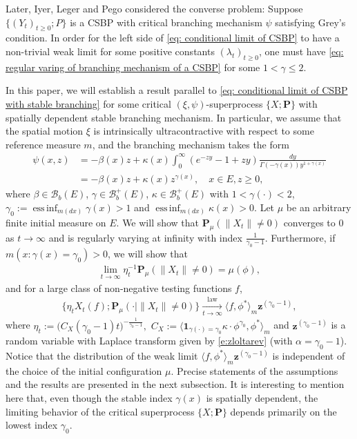 \documentclass[12pt,a4paper]{amsart}
\theoremstyle{definition}
\numberwithin{equation}{section}
\begin{document}
Later, Iyer, Leger and Pego \cite{IyerLegerPego2015Limit} considered the converse problem:
Suppose  $\{(Y_t)_{t\geq 0}; P\}$ is a CSBP
with critical branching mechanism $\psi$ satisfying Grey's condition.
In order for the left side of \eqref{eq: conditional limit of CSBP} to have a non-trivial weak limit for some positive constants $(\lambda_t)_{t\geq 0}$, one must have \eqref{eq: regular varing of branching mechanism of a CSBP} for some $1< \gamma \leq 2$.
	
In this paper, we will establish a result parallel to \eqref{eq: conditional limit of CSBP with stable branching} for some critical $(\xi,\psi)$-superprocess $\{X; \mathbf P\}$ with spatially dependent stable branching mechanism.
In particular, we assume that the spatial motion $\xi$ is intrinsically ultracontractive with respect to some reference measure $m$, and the branching mechanism takes the form
\begin{align}
	\psi(x,z)   
  &= - \beta(x) z + \kappa(x) \int_0^\infty (e^{-z y} - 1+ z y) \frac{dy}{\Gamma(- \gamma(x)) y^{1+ \gamma(x)}}
  \\&=  -\beta (x) z + \kappa(x) z^{\gamma(x)},
	\quad x\in E, z \geq 0,
\end{align}
where $\beta \in \mathscr B_b(E)$, $\gamma \in \mathscr B^+_b(E)$, $\kappa \in \mathscr B^+_b(E)$ with $1< \gamma(\cdot )<2$, $\gamma_0 := \operatorname{ess\,inf}_{m(dx)} \gamma(x)> 1$ and $\operatorname{ess\,inf}_{m(dx)}\kappa(x) > 0$.
Let $\mu$ be an arbitrary finite initial measure on $E$.
We will show that $\mathbf P_{\mu}( \| X_t\| \neq 0)$ converges to $0$ as $t\to \infty$ and is regularly varying at infinity with index $\frac{1}{\gamma_0 - 1}$.
Furthermore, if $m(x: \gamma(x) = \gamma_0)>0$, we will show that
\begin{align}
	\lim_{t\to \infty}\eta^{-1}_t \mathbf P_{\mu}( \|X_t\| \neq0)
	= \mu(\phi),
\end{align}
and for a large class of non-negative testing functions $f$,
\begin{align}\label{eq: result2}
	\{ \eta_t X_t(f) ; \mathbf P_{\mu}(\cdot | \|X_t\|\neq 0) \}
	\xrightarrow[t\to \infty]{\operatorname{law}}
	\langle f, \phi^*\rangle_m \mathbf z^{(\gamma_0 - 1)},
\end{align}
where $\eta_t := \big( C_X(\gamma_0 - 1) t \big)^{- \frac {1} {\gamma_0 - 1} },$ $C_X := \langle \mathbf 1_{\gamma(\cdot) = \gamma_0} \kappa\cdot \phi^{\gamma_0}, \phi^* \rangle_m$ and $\mathbf z^{(\gamma_0 - 1)}$ is a random variable with Laplace transform given by \eqref{e:zloltarev} (with $\alpha=\gamma_0-1$).
Notice that the distribution of the weak limit $\langle f, \phi^*\rangle_m \mathbf z^{(\gamma_0 - 1)}$ is independent of the choice of the initial configuration $\mu$.
Precise statements of the assumptions and the results are presented in the next subsection.
It is interesting to mention here that, even though the stable index $\gamma(x)$ is spatially dependent, the limiting behavior of the critical superprocess $\{X; \mathbf P\}$ depends primarily on the lowest index $\gamma_0$.
\end{document}
